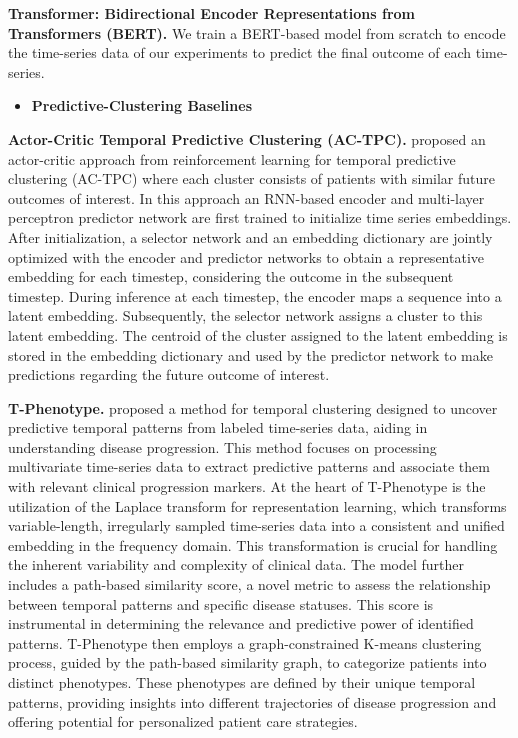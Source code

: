 {\raggedright
\noindent
\textbf{Transformer: Bidirectional Encoder Representations from Transformers (BERT).} 
We train a BERT-based \citep{devlin2018bert} model from scratch to encode the time-series data of our experiments to predict the final outcome of each time-series.\par
}


\begin{itemize}
    \item \textbf{Predictive-Clustering Baselines}
    
\end{itemize}
\noindent
\textbf{Actor-Critic Temporal Predictive Clustering (AC-TPC).}
\citet{lee2020temporal} proposed an actor-critic approach from reinforcement learning for temporal predictive clustering (AC-TPC) where each cluster consists of patients with similar future outcomes of interest.
In this approach an RNN-based encoder and multi-layer perceptron predictor network are first trained to initialize time series embeddings.
After initialization, a selector network and an embedding dictionary are jointly optimized with the encoder and predictor networks to obtain a representative embedding for each timestep, considering the outcome in the subsequent timestep.
During inference at each timestep, the encoder maps a sequence into a latent embedding.
Subsequently, the selector network assigns a cluster to this latent embedding.
The centroid of the cluster assigned to the latent embedding is stored in the embedding dictionary and used by the predictor network to make predictions regarding the future outcome of interest.


\noindent
\textbf{T-Phenotype.}
\citet{qin2023t} proposed a method for temporal clustering designed to uncover predictive temporal patterns from labeled time-series data, aiding in understanding disease progression. This method focuses on processing multivariate time-series data to extract predictive patterns and associate them with relevant clinical progression markers. At the heart of T-Phenotype is the utilization of the Laplace transform for representation learning, which transforms variable-length, irregularly sampled time-series data into a consistent and unified embedding in the frequency domain. This transformation is crucial for handling the inherent variability and complexity of clinical data. The model further includes a path-based similarity score, a novel metric to assess the relationship between temporal patterns and specific disease statuses. This score is instrumental in determining the relevance and predictive power of identified patterns. T-Phenotype then employs a graph-constrained K-means clustering process, guided by the path-based similarity graph, to categorize patients into distinct phenotypes. These phenotypes are defined by their unique temporal patterns, providing insights into different trajectories of disease progression and offering potential for personalized patient care strategies.

